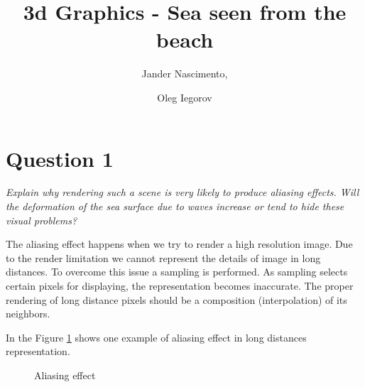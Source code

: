 \documentclass{report}
\begin{document}
\title{3d Graphics - Sea seen from the beach}

\author{Jander Nascimento, 
\and Oleg Iegorov}

\maketitle

\section{Question 1}

\emph{Explain why rendering such a scene is very likely to produce
aliasing effects. Will the deformation of the sea surface due to waves
increase or tend to hide these visual problems?}

The aliasing effect happens when we try to render a high resolution image\cite{iaow}. Due to the render limitation we cannot represent the details of image in long distances. To overcome this issue a sampling is performed. As sampling selects certain pixels for displaying, the representation becomes inaccurate. The proper rendering of long distance pixels should be a composition (interpolation) of its neighbors.

In the Figure \ref{fig:aliasing} shows one example of aliasing effect in long distances representation.

\begin{figure}[H]
		  \centering
		  \hspace{0.1cm}
		  \caption{Aliasing effect}
		  \label{fig:aliasing}
\end{figure}
\end{document}
